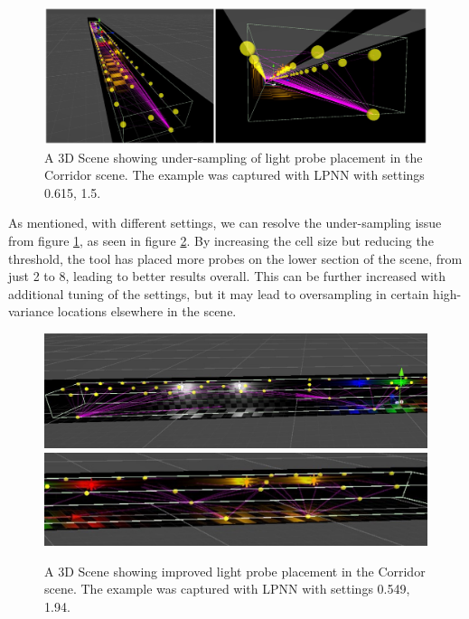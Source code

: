 \begin{figure}[h]
	\centering
	\includegraphics[width=\linewidth]{Graphics/results/concats/comparison3.png}
	\caption{A 3D Scene showing under-sampling of light probe placement in the Corridor scene. The example was captured with LPNN with settings 0.615, 1.5.}
	\label{fig:comp3}
\end{figure}

As mentioned, with different settings, we can resolve the under-sampling issue from figure \ref{fig:comp3}, as seen in figure \ref{fig:comp4}. By increasing the cell size but reducing the threshold, the tool has placed more probes on the lower section of the scene, from just 2 to 8, leading to better results overall. This can be further increased with additional tuning of the settings, but it may lead to oversampling in certain high-variance locations elsewhere in the scene.

\begin{figure}[h]
	\centering
	\includegraphics[width=\linewidth]{Graphics/results/corridor_0.549_1.94_E2.jpg}
	\includegraphics[width=\linewidth]{Graphics/results/corridor_0.549_1.94_E3.jpg}
	\caption{A 3D Scene showing improved light probe placement in the Corridor scene. The example was captured with LPNN with settings 0.549, 1.94.}
	\label{fig:comp4}
\end{figure}


